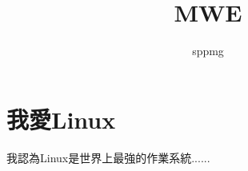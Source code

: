 \documentclass[12pt,a4paper]{article}
\author{sppmg}
\title{MWE}
\begin{document}
\maketitle

\section{我愛Linux}
我認為Linux是世界上最強的作業系統......
\end{document}
